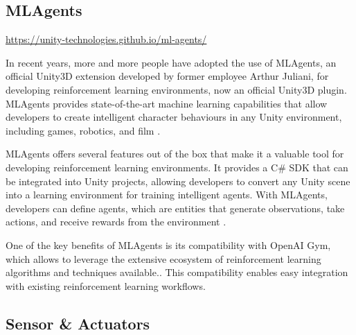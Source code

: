 
\subsection{MLAgents}
{\url{https://unity-technologies.github.io/ml-agents/}}

\begin{textblock}
In recent years, more and more people have adopted the use of MLAgents, an official Unity3D extension developed by former employee Arthur Juliani, for developing reinforcement learning environments, now an official Unity3D plugin. MLAgents provides state-of-the-art machine learning capabilities that allow developers to create intelligent character behaviours in any Unity environment, including games, robotics, and film \cite{mlagentscode}.

MLAgents offers several features out of the box that make it a valuable tool for developing reinforcement learning environments. It provides a C\# SDK that can be integrated into Unity projects, allowing developers to convert any Unity scene into a learning environment for training intelligent agents. With MLAgents, developers can define agents, which are entities that generate observations, take actions, and receive rewards from the environment \cite{mlagentsdocs}.

One of the key benefits of MLAgents is its compatibility with OpenAI Gym, which allows to leverage the extensive ecosystem of reinforcement learning algorithms and techniques available.\cite{mlagentscode}. This compatibility enables easy integration with existing reinforcement learning workflows.

\end{textblock}


\subsection{Sensor \& Actuators}

